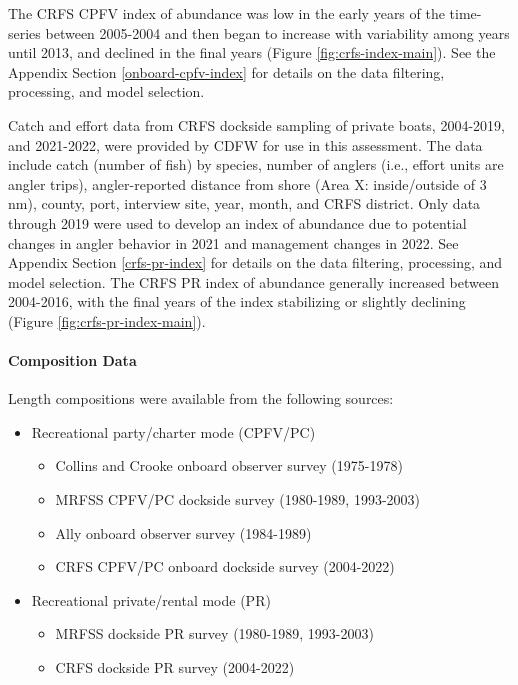 \documentclass[11pt,
  english,
  letterpaper,
]{article}
\providecommand{\tightlist}{%
  \setlength{\itemsep}{0pt}\setlength{\parskip}{0pt}}
\providecommand{\tightlist}{%
  \setlength{\itemsep}{0pt}\setlength{\parskip}{0pt}}
\begin{document}
The CRFS CPFV index of abundance was low in the early years of the time-series between 2005-2004 and then began to increase with variability among years until 2013, and declined in the final years (Figure \ref{fig:crfs-index-main}). See the Appendix Section \ref{onboard-cpfv-index} for details on the data filtering, processing, and model selection.

Catch and effort data from CRFS dockside sampling of private boats, 2004-2019, and 2021-2022, were provided by CDFW for use in this assessment. The data include catch (number of fish) by species, number of anglers (i.e., effort units are angler trips), angler-reported distance from shore (Area X: inside/outside of 3 nm), county, port, interview site, year, month, and CRFS district. Only data through 2019 were used to develop an index of abundance due to potential changes in angler behavior in 2021 and management changes in 2022. See Appendix Section \ref{crfs-pr-index} for details on the data filtering, processing, and model selection. The CRFS PR index of abundance generally increased between 2004-2016, with the final years of the index stabilizing or slightly declining (Figure \ref{fig:crfs-pr-index-main}).

\hypertarget{composition-data-1}{%
\paragraph{Composition Data}\label{composition-data-1}}

\hfill\break

Length compositions were available from the following sources:

\begin{itemize}
\item
  Recreational party/charter mode (CPFV/PC)

  \begin{itemize}
  \tightlist
  \item
    Collins and Crooke onboard observer survey (1975-1978)
  \item
    MRFSS CPFV/PC dockside survey (1980-1989, 1993-2003)
  \item
    Ally onboard observer survey (1984-1989)
  \item
    CRFS CPFV/PC onboard dockside survey (2004-2022)
  \end{itemize}
\item
  Recreational private/rental mode (PR)

  \begin{itemize}
  \tightlist
  \item
    MRFSS dockside PR survey (1980-1989, 1993-2003)
  \item
    CRFS dockside PR survey (2004-2022)
  \end{itemize}
\end{itemize}
\end{document}
